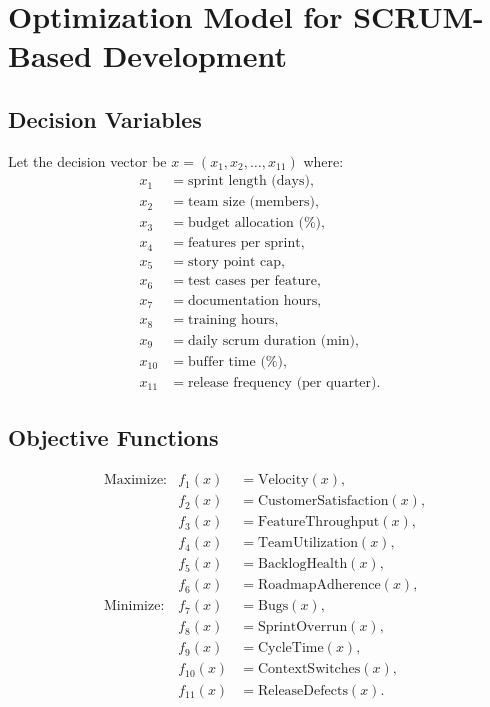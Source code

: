 \documentclass{article}
\begin{document}
\section*{Optimization Model for SCRUM-Based Development}

\subsection*{Decision Variables}
Let the decision vector be \( x = (x_1, x_2, \dots, x_{11}) \) where:
\begin{align*}
x_1 &= \text{sprint length (days)}, \\
x_2 &= \text{team size (members)}, \\
x_3 &= \text{budget allocation (\%)}, \\
x_4 &= \text{features per sprint}, \\
x_5 &= \text{story point cap}, \\
x_6 &= \text{test cases per feature}, \\
x_7 &= \text{documentation hours}, \\
x_8 &= \text{training hours}, \\
x_9 &= \text{daily scrum duration (min)}, \\
x_{10} &= \text{buffer time (\%)}, \\
x_{11} &= \text{release frequency (per quarter)}.
\end{align*}

\subsection*{Objective Functions}
\[
\begin{aligned}
& \text{Maximize:} & f_1(x) &= \text{Velocity}(x), \\
& & f_2(x) &= \text{CustomerSatisfaction}(x), \\
& & f_3(x) &= \text{FeatureThroughput}(x), \\
& & f_4(x) &= \text{TeamUtilization}(x), \\
& & f_5(x) &= \text{BacklogHealth}(x), \\
& & f_6(x) &= \text{RoadmapAdherence}(x), \\
& \text{Minimize:} & f_7(x) &= \text{Bugs}(x), \\
& & f_8(x) &= \text{SprintOverrun}(x), \\
& & f_9(x) &= \text{CycleTime}(x), \\
& & f_{10}(x) &= \text{ContextSwitches}(x), \\
& & f_{11}(x) &= \text{ReleaseDefects}(x).
\end{aligned}
\]
\end{document}
